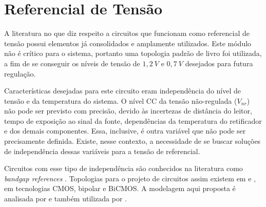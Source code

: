 



\section{Referencial de Tensão}
A literatura no que diz respeito a circuitos que funcionam como referencial de tensão possui elementos já consolidados e amplamente utilizados. Este módulo não é crítico para o sistema, portanto uma topologia padrão de livro foi utilizada, a fim de se conseguir os níveis de tensão de $1,2~V$ e $0,7~V$ desejados para futura regulação.

Características desejadas para este circuito eram independência do nível de tensão e da temperatura do sistema. O nível {CC} da tensão não-regulada ($V_{nr}$) não pode ser previsto com precisão, devido às incertezas de distância do leitor, tempo de exposição ao sinal da fonte, dependências da temperatura do retificador e dos demais componentes. Essa, inclusive, é outra variável que não pode ser precisamente definida. Existe, nesse contexto, a necessidade de se buscar soluções de independência dessas variáveis para a tensão de referencial.

Circuitos com esse tipo de independência são conhecidos na literatura como \textit{bandgap references} \cite{ALLEN:2002}. Topologias para o projeto de circuitos assim existem em  e , em tecnologias CMOS, bipolar e BiCMOS. A modelagem aqui proposta é analisada por  e também utilizada por .

